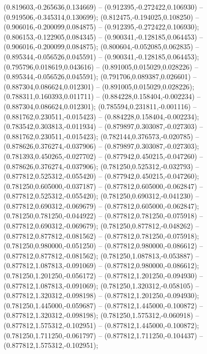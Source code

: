  (0.819603,-0.265636,0.134669) -- (0.912395,-0.272422,0.106930) -- (0.919506,-0.345314,0.130699);
 (0.812475,-0.194025,0.108250) -- (0.906016,-0.200099,0.084875) -- (0.912395,-0.272422,0.106930);
 (0.806153,-0.122905,0.084345) -- (0.900341,-0.128185,0.064453) -- (0.906016,-0.200099,0.084875);
 (0.800604,-0.052085,0.062835) -- (0.895344,-0.056526,0.045591) -- (0.900341,-0.128185,0.064453);
 (0.795796,0.018619,0.043616) -- (0.891005,0.015029,0.028226) -- (0.895344,-0.056526,0.045591);
 (0.791706,0.089387,0.026601) -- (0.887304,0.086624,0.012301) -- (0.891005,0.015029,0.028226);
 (0.788311,0.160393,0.011711) -- (0.884228,0.158404,-0.002234) -- (0.887304,0.086624,0.012301);
 (0.785594,0.231811,-0.001116) -- (0.881762,0.230511,-0.015423) -- (0.884228,0.158404,-0.002234);
 (0.783542,0.303813,-0.011934) -- (0.879897,0.303087,-0.027303) -- (0.881762,0.230511,-0.015423);
 (0.782144,0.376573,-0.020785) -- (0.878626,0.376274,-0.037906) -- (0.879897,0.303087,-0.027303);
 (0.781393,0.450265,-0.027702) -- (0.877942,0.450215,-0.047260) -- (0.878626,0.376274,-0.037906);
 (0.781250,0.525312,-0.032793) -- (0.877812,0.525312,-0.055420) -- (0.877942,0.450215,-0.047260);
 (0.781250,0.605000,-0.037187) -- (0.877812,0.605000,-0.062847) -- (0.877812,0.525312,-0.055420);
 (0.781250,0.690312,-0.041230) -- (0.877812,0.690312,-0.069679) -- (0.877812,0.605000,-0.062847);
 (0.781250,0.781250,-0.044922) -- (0.877812,0.781250,-0.075918) -- (0.877812,0.690312,-0.069679);
 (0.781250,0.877812,-0.048262) -- (0.877812,0.877812,-0.081562) -- (0.877812,0.781250,-0.075918);
 (0.781250,0.980000,-0.051250) -- (0.877812,0.980000,-0.086612) -- (0.877812,0.877812,-0.081562);
 (0.781250,1.087813,-0.053887) -- (0.877812,1.087813,-0.091069) -- (0.877812,0.980000,-0.086612);
 (0.781250,1.201250,-0.056172) -- (0.877812,1.201250,-0.094930) -- (0.877812,1.087813,-0.091069);
 (0.781250,1.320312,-0.058105) -- (0.877812,1.320312,-0.098198) -- (0.877812,1.201250,-0.094930);
 (0.781250,1.445000,-0.059687) -- (0.877812,1.445000,-0.100872) -- (0.877812,1.320312,-0.098198);
 (0.781250,1.575312,-0.060918) -- (0.877812,1.575312,-0.102951) -- (0.877812,1.445000,-0.100872);
 (0.781250,1.711250,-0.061797) -- (0.877812,1.711250,-0.104437) -- (0.877812,1.575312,-0.102951);
